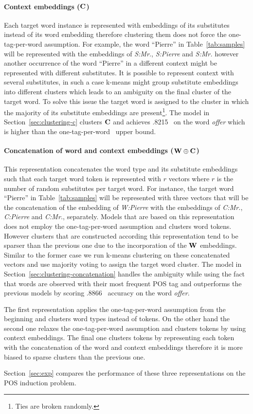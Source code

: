 \paragraph{Context embeddings (${\bf C}$)} 
Each target word instance is represented with embeddings of its
substitutes instead of its word embedding therefore clustering them
does not force the one-tag-per-word assumption.  For example, the word
``Pierre'' in Table~\ref{tab:samples} will be represented with the
embeddings of {\it S:Mr.}, {\it S:Pierre} and {\it S:Mr.}  however
another occurrence of the word ``Pierre'' in a different context might
be represented with different substitutes.  It is possible to
represent context with several substitutes, in such a case k-means
might group substitute embeddings into different clusters which leads
to an ambiguity on the final cluster of the target word.  To solve
this issue the target word is assigned to the cluster in which the
majority of its substitute embeddings are present\footnote{Ties are
  broken randomly.}.  The model in Section~\ref{sec:clustering-c}
clusters ${\bf C}$ and achieves .8215 \mto\ on the word {\it offer}
which is higher than the one-tag-per-word \mto\ upper bound.

\paragraph{Concatenation of word and context embeddings (${\bf W\oplus
    C}$)}
This representation concatenates the word type and its substitute
embeddings such that each target word token is represented with $r$
vectors where $r$ is the number of random substitutes per target word.
For instance, the target word ``Pierre'' in Table~\ref{tab:samples}
will be represented with three vectors that will be the concatenation
of the embedding of {\it W:Pierre} with the embeddings of {\it C:Mr.},
{\it C:Pierre} and {\it C:Mr.}, separately.  Models that are based on
this representation does not employ the one-tag-per-word assumption
and clusters word tokens.  However clusters that are constructed
according this representation tend to be sparser than the previous one
due to the incorporation of the ${\bf W}$ embeddings.
Similar to the former case we run k-means clustering on these
concatenated vectors and use majority voting to assign the target word
cluster.  The model in Section~\ref{sec:clustering-concatenation}
handles the ambiguity while using the fact that words are observed
with their most frequent POS tag and outperforms the previous models
by scoring .8866 \mto\ accuracy on the word {\it offer}.

The first representation applies the one-tag-per-word assumption from
the beginning and clusters word types instead of tokens.  On the other
hand the second one relaxes the one-tag-per-word assumption and
clusters tokens by using context embeddings.  The final one clusters
tokens by representing each token with the concatenation of the word
and context embeddings therefore it is more biased to sparse clusters
than the previous one.

Section~\ref{sec:exp} compares the performance of these three
representations on the POS induction problem.
